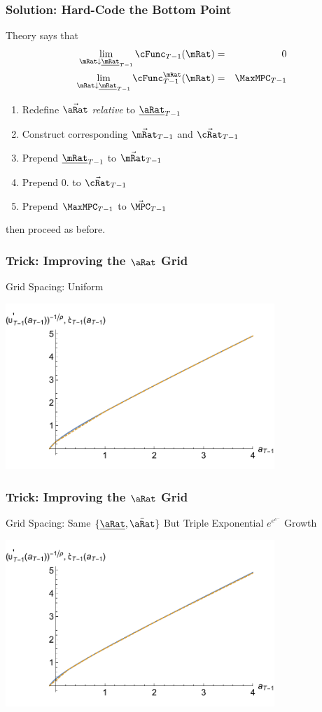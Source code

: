 \documentclass{beamer}
\begin{document}
\begin{frame}
\frametitle{Solution: Hard-Code the Bottom Point}

Theory says that
\begin{eqnarray}
  \lim_{\mRat \downarrow \underline{\mRat}_{T-1}} \cFunc_{T-1}(\mRat) & = & 0
\\ \lim_{\mRat \downarrow \underline{\mRat}_{T-1}} \cFunc_{T-1}^{\mRat}(\mRat) & = & \MaxMPC_{T-1}
\end{eqnarray}

\medskip 

\begin{enumerate}
\item Redefine $\vec{\aRat}$ {\it relative} to $\uline{\aRat}_{T-1}$
\item Construct corresponding $\vec{\mRat}_{T-1}$ and $\vec{\cRat}_{T-1}$
\item Prepend $\uline{\mRat}_{T-1}$ to $\vec{\mRat}_{T-1}$
\item Prepend $0.$ to $\vec{\cRat}_{T-1}$
\item Prepend $\MaxMPC_{T-1}$ to $\vec{\MPC}_{T-1}$
\end{enumerate}
then proceed as before.

\end{frame}

\begin{frame}
\frametitle{Trick: Improving the $\aRat$ Grid}
Grid Spacing: Uniform

\includegraphics[width=4in]{./Figures/GothVInvVSGothC.pdf}

\end{frame}

\begin{frame}
\frametitle{Trick: Improving the $\aRat$ Grid}
Grid Spacing: Same $\{\uline{\aRat},\bar{\aRat}\}$ But Triple Exponential $e^{e^{e^{...}}}$ Growth

\includegraphics[width=4in]{./Figures/GothVInvVSGothCEEE.pdf}

\end{frame}
\end{document}
